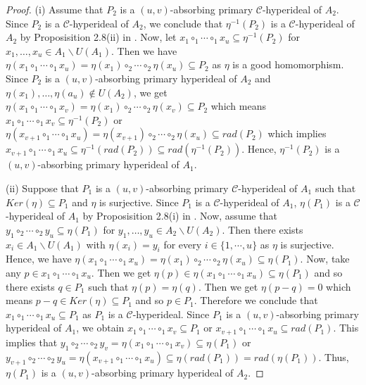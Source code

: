 \documentclass[preprint,review,10pt]{amsart}
\theoremstyle{definition}
\theoremstyle{remark}
\numberwithin{equation}{section}
\begin{document}
\begin{proof}
(i) Assume that $P_2$ is a $(u,v)$-absorbing primary $\mathcal{C}$-hyperideal of $A_2$. Since $P_2$ is a $\mathcal{C}$-hyperideal of $A_2$, we conclude that $\eta^{-1}(P_2)$ is a $\mathcal{C}$-hyperideal of $A_2$ by Proposisition 2.8(ii) in \cite{Sen}. Now, let $ x_1 \circ_1 \cdots \circ_1 x_u \subseteq \eta^{-1}(P_2)$ for $x_1,\ldots,x_u \in A_1 \backslash U(A_1)$. Then we have $ \eta(x_1 \circ_1 \cdots \circ_1 x_u)=\eta(x_1) \circ_2 \cdots \circ_2 \eta(x_u) \subseteq P_2$ as $\eta$ is a good homomorphism. Since $P_2$ is a $(u,v)$-absorbing primary hyperideal of $A_2$ and $\eta(x_1),\ldots,\eta(a_u) \notin U(A_2)$, we get $\eta(x_1 \circ_1 \cdots \circ_1 x_v)=\eta(x_1) \circ_2 \cdots \circ_2 \eta(x_v) \subseteq P_2$ which means $x_1 \circ_1 \cdots \circ_1 x_v \subseteq \eta^{-1}(P_2)$ or $\eta(x_{v+1} \circ_1 \cdots \circ_1 x_u)=\eta(x_{v+1}) \circ_2 \cdots \circ_2 \eta(x_u) \subseteq rad(P_2)$ which implies $x_{v+1} \circ_1 \cdots \circ_1 x_u \subseteq \eta^{-1}(rad(P_2)) \subseteq rad(\eta^{-1}(P_2))$. Hence,  $\eta^{-1}(P_2)$ is a $(u,v)$-absorbing primary hyperideal of $A_1$.


(ii) Suppose that $P_1$ is  a $(u,v)$-absorbing primary $\mathcal{C}$-hyperideal of $A_1$ such that $Ker (\eta) \subseteq P_1$ and $\eta$ is surjective. Since $P_1$ is a $\mathcal{C}$-hyperideal of $A_1$, $\eta(P_1)$ is a $\mathcal{C}$-hyperideal of $A_1$ by Proposisition 2.8(i) in \cite{Sen}. Now, assume that $ y_1 \circ_2 \cdots \circ_2 y_u \subseteq \eta(P_1)$ for $y_1, \ldots, y_u \in A_2 \backslash U(A_2)$. Then there exists $x_i \in A_1 \backslash U(A_1)$ with $\eta(x_i)=y_i$ for every $i \in \{1,\cdots,u\}$ as $\eta$ is surjective. Hence, we have $\eta(x_1 \circ_1 \cdots \circ_1 x_u)=\eta(x_1) \circ_2 \cdots \circ_2 \eta(x_u)\subseteq \eta(P_1)$. Now, take any $p \in x_1 \circ_1 \cdots \circ_1 x_u$. Then we get $\eta(p) \in \eta(x_1 \circ_1 \cdots \circ_1 x_u) \subseteq \eta(P_1)$ and so there exists $q \in P_1$ such that $\eta(p)=\eta(q)$. Then we get $\eta(p-q)=0$ which means $p-q \in Ker (\eta)\subseteq P_1$ and so $p \in P_1$. Therefore we conclude that $x_1 \circ_1 \cdots \circ_1 x_u \subseteq P_1$ as $P_1$ is a $\mathcal{C}$-hyperideal. Since $P_1$ is a $(u,v)$-absorbing primary hyperideal of $A_1$, we obtain $x_1 \circ_1 \cdots \circ_1 x_v \subseteq P_1$ or $x_{v+1} \circ_1 \cdots \circ_1 x_u \subseteq rad(P_1)$. This implies that $y_1 \circ_2 \cdots \circ_2 y_v =\eta(x_1 \circ_1 \cdots \circ_1 x_v )\subseteq \eta(P_1)$ or $y_{v+1} \circ_2 \cdots \circ_2 y_u=\eta(x_{v+1} \circ_1 \cdots \circ_1 x_u )\subseteq \eta(rad(P_1))=rad(\eta(P_1))$. Thus, $\eta(P_1)$ is a $(u,v)$-absorbing primary hyperideal of $A_2$.
\end{proof}
\end{document}
